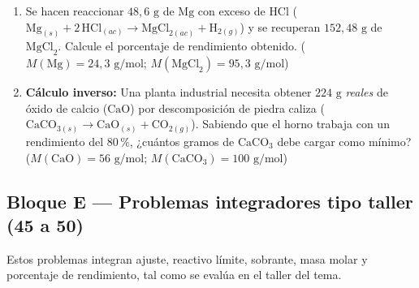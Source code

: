 \documentclass[12pt, letterpaper]{article}
\newcommand{\pc}{\text{\%}}
\begin{document}
\begin{enumerate}[leftmargin=*, start=37]
  \item \dificil{}\hspace{0.55em}Se hacen reaccionar $48{,}6\text{ g}$ de $\text{Mg}$ con exceso de $\text{HCl}$ ($\text{Mg}_{(s)} + 2\,\text{HCl}_{(ac)} \longrightarrow \text{MgCl}_{2(ac)} + \text{H}_{2(g)}$) y se recuperan $152{,}48\text{ g}$ de $\text{MgCl}_2$. Calcule el porcentaje de rendimiento obtenido. ($M(\text{Mg}) = 24{,}3\text{ g/mol}$; $M(\text{MgCl}_2) = 95{,}3\text{ g/mol}$)

  \item \muyDificil{}\hspace{0.55em}\textbf{Cálculo inverso:} Una planta industrial necesita obtener $224\text{ g}$ \emph{reales} de óxido de calcio ($\text{CaO}$) por descomposición de piedra caliza ($\text{CaCO}_{3(s)} \longrightarrow \text{CaO}_{(s)} + \text{CO}_{2(g)}$). Sabiendo que el horno trabaja con un rendimiento del $80\,\pc$, ¿cuántos gramos de $\text{CaCO}_3$ debe cargar como mínimo? ($M(\text{CaO}) = 56\text{ g/mol}$; $M(\text{CaCO}_3) = 100\text{ g/mol}$)

\end{enumerate}

\subsection{Bloque E — Problemas integradores tipo taller (45 a 50)}

\noindent Estos problemas integran ajuste, reactivo límite, sobrante, masa molar y porcentaje de rendimiento, tal como se evalúa en el taller del tema.
\end{document}
